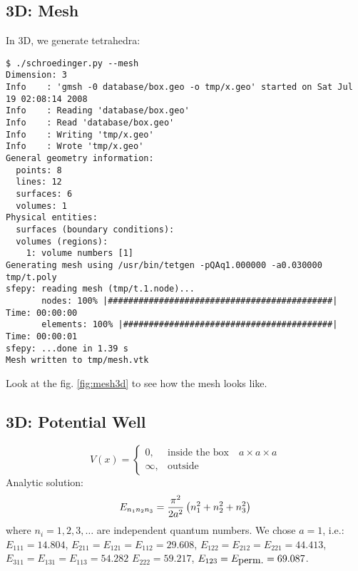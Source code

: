\subsection{3D: Mesh}

In 3D, we generate tetrahedra:

\begin{lstlisting}
$ ./schroedinger.py --mesh
Dimension: 3
Info    : 'gmsh -0 database/box.geo -o tmp/x.geo' started on Sat Jul 19 02:08:14 2008
Info    : Reading 'database/box.geo'
Info    : Read 'database/box.geo'
Info    : Writing 'tmp/x.geo'
Info    : Wrote 'tmp/x.geo'
General geometry information:
  points: 8
  lines: 12
  surfaces: 6
  volumes: 1
Physical entities:
  surfaces (boundary conditions):
  volumes (regions):
    1: volume numbers [1]
Generating mesh using /usr/bin/tetgen -pQAq1.000000 -a0.030000 tmp/t.poly
sfepy: reading mesh (tmp/t.1.node)...
       nodes: 100% |############################################| Time: 00:00:00
       elements: 100% |#########################################| Time: 00:00:01
sfepy: ...done in 1.39 s
Mesh written to tmp/mesh.vtk
\end{lstlisting}

Look at the fig. \ref{fig:mesh3d} to see how the mesh looks like.


\subsection{3D: Potential Well}

$$V(x)=\begin{cases}0,&\text{inside the box}\quad a\times a\times a \\
\infty, & \text{outside}\end{cases}$$
Analytic solution:
$$E_{n_1n_2n_3}={\pi^2\over2a^2}\left(n_1^2 + n_2^2 + n_3^2\right)$$
where $n_i = 1, 2, 3, \dots$ are independent quantum numbers.
We chose $a=1$, i.e.: $E_{111}=14.804$, $E_{211}=E_{121}=E_{112}=29.608$,
$E_{122}=E_{212}=E_{221}=44.413$,
$E_{311}=E_{131}=E_{113}=54.282$
$E_{222}=59.217$, $E_{123}=E_{\hbox{perm.}}=69.087$.

